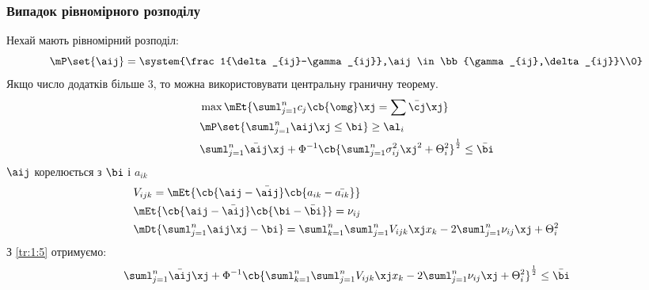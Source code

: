 \subsubsection{Випадок рівномірного розподілу}
Нехай \aij мають рівномірний розподіл: 
\begin{equation}
\mP\set{\aij} = \system{\frac1{\delta_{ij}-\gamma_{ij}},\aij\in\bb{\gamma_{ij},\delta_{ij}}\\0}\\
\end{equation}
Якщо число додатків більше 3, то можна використовувати центральну граничну теорему.\\
\begin{eqnarray}
&\max \mEt{\suml_{j=1}^n c_j \cb{\omg} \xj = \sum \bar{\cj} \xj}\\
&\mP\set{\suml_{j=1}^n\aij \xj \leq \bi} \geq \al_i\\
&\suml_{j=1}^n \bar{\aij} \xj + \Phi^{-1} \cb{\suml_{j=1}^n \sigma^2_{ij} \xj^2 +\Theta_i^2}^{\frac12} \leq \bar{\bi}\label{tr:1:5}
\end{eqnarray}
$\aij$ корелюється з $\bi$ і $a_{ik}$
\begin{eqnarray}
&V_{ijk} = \mEt{\cb{\aij-\bar{\aij}}\cb{a_{ik} - \bar{a_{ik}}}}\\
&\mEt{\cb{\aij - \bar{\aij}}\cb{\bi - \bar{\bi}}} = \nu_{ij}\\
&\mDt{\suml_{j=1}^n \aij \xj - \bi} = \suml_{k=1}^n \suml_{j=1}^n V_{ijk} \xj x_k - 2\suml_{j=1}^n \nu_{ij} \xj + \Theta^2_i
\end{eqnarray}
З \eqref{tr:1:5} отримуємо:
\begin{equation}
\suml_{j=1}^n \bar{\aij} \xj + \Phi^{-1} \cb{\suml_{k=1}^n \suml_{j=1}^n V_{ijk} \xj x_k - 2\suml_{j=1}^n \nu_{ij} \xj + \Theta^2_i}^{\frac12} \leq \bar{\bi}
\end{equation}